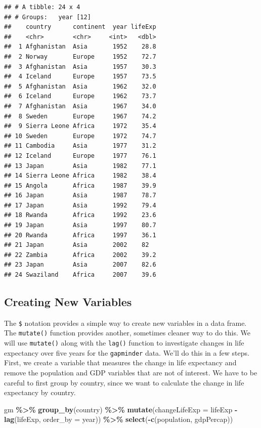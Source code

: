 \documentclass[
]{krantz}
\newenvironment{Shaded}{\begin{snugshade}}{\end{snugshade}}
\newcommand{\DataTypeTok}[1]{\textcolor[rgb]{0.13,0.29,0.53}{#1}}
\newcommand{\KeywordTok}[1]{\textcolor[rgb]{0.13,0.29,0.53}{\textbf{#1}}}
\newcommand{\NormalTok}[1]{#1}
\newcommand{\OperatorTok}[1]{\textcolor[rgb]{0.81,0.36,0.00}{\textbf{#1}}}
\newcommand{\StringTok}[1]{\textcolor[rgb]{0.31,0.60,0.02}{#1}}
\begin{document}
\begin{verbatim}
## # A tibble: 24 x 4
## # Groups:   year [12]
##    country      continent  year lifeExp
##    <chr>        <chr>     <int>   <dbl>
##  1 Afghanistan  Asia       1952    28.8
##  2 Norway       Europe     1952    72.7
##  3 Afghanistan  Asia       1957    30.3
##  4 Iceland      Europe     1957    73.5
##  5 Afghanistan  Asia       1962    32.0
##  6 Iceland      Europe     1962    73.7
##  7 Afghanistan  Asia       1967    34.0
##  8 Sweden       Europe     1967    74.2
##  9 Sierra Leone Africa     1972    35.4
## 10 Sweden       Europe     1972    74.7
## 11 Cambodia     Asia       1977    31.2
## 12 Iceland      Europe     1977    76.1
## 13 Japan        Asia       1982    77.1
## 14 Sierra Leone Africa     1982    38.4
## 15 Angola       Africa     1987    39.9
## 16 Japan        Asia       1987    78.7
## 17 Japan        Asia       1992    79.4
## 18 Rwanda       Africa     1992    23.6
## 19 Japan        Asia       1997    80.7
## 20 Rwanda       Africa     1997    36.1
## 21 Japan        Asia       2002    82  
## 22 Zambia       Africa     2002    39.2
## 23 Japan        Asia       2007    82.6
## 24 Swaziland    Africa     2007    39.6
\end{verbatim}

\hypertarget{creating-new-variables}{%
\subsection{Creating New Variables}\label{creating-new-variables}}

The \texttt{\$} notation provides a simple way to create new variables in a data frame. The \texttt{mutate()} function provides another, sometimes cleaner way to do this. We will use \texttt{mutate()} along with the \texttt{lag()} function to investigate changes in life expectancy over five years for the \texttt{gapminder} data. We'll do this in a few steps. First, we create a variable that measures the change in life expectancy and remove the population and GDP variables that are not of interest. We have to be careful to first group by country, since we want to calculate the change in life expectancy by country.

\begin{Shaded}
\begin{Highlighting}[]
\NormalTok{gm }\OperatorTok{\%\textgreater{}\%}\StringTok{ }
\StringTok{  }\KeywordTok{group\_by}\NormalTok{(country) }\OperatorTok{\%\textgreater{}\%}\StringTok{ }
\StringTok{  }\KeywordTok{mutate}\NormalTok{(}\DataTypeTok{changeLifeExp =}\NormalTok{ lifeExp }\OperatorTok{{-}}\StringTok{ }\KeywordTok{lag}\NormalTok{(lifeExp, }\DataTypeTok{order\_by =}\NormalTok{ year)) }\OperatorTok{\%\textgreater{}\%}\StringTok{ }
\StringTok{  }\KeywordTok{select}\NormalTok{(}\OperatorTok{{-}}\KeywordTok{c}\NormalTok{(population, gdpPercap))}
\end{Highlighting}
\end{Shaded}
\end{document}
